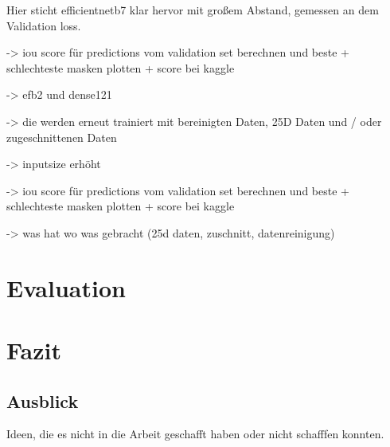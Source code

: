 Hier sticht efficientnetb7 klar hervor mit großem Abstand, gemessen an dem Validation loss. 

\begin{table}[H]
\caption{\label{tab:efb256}Baseline Performances nach Validation loss absteigend sortiert.}
\end{table}

-> iou score für predictions vom validation set berechnen und beste + schlechteste masken plotten + score bei kaggle 

-> efb2 und dense121 

-> die werden erneut trainiert mit bereinigten Daten, 25D Daten und / oder zugeschnittenen Daten

-> inputsize erhöht

-> iou score für predictions vom validation set berechnen und beste + schlechteste masken plotten + score bei kaggle 

-> was hat wo was gebracht (25d daten, zuschnitt, datenreinigung) 

\section{Evaluation}\raggedbottom

\section{Fazit}\raggedbottom

\subsection{Ausblick}
Ideen, die es nicht in die Arbeit geschafft haben oder nicht schafffen konnten.


\pagebreak
